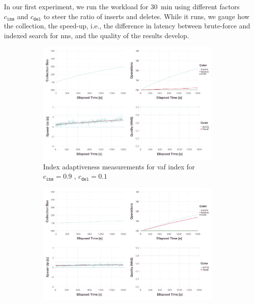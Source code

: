 In our first experiment, we run the workload for \SI{30}{\minute} using different factors $c_{\texttt{ins}}$ and $c_{\texttt{del}}$ to steer the ratio of inserts and deletes. While it runs, we gauge how the collection, the speed-up, i.e., the difference in latency between brute-force and indexed search for \acrshort{nns}, and the quality of the results develop.

\begin{figure}[p]
    \centering
    \begin{subfigure}[b]{\textwidth}
        \centering
        \includegraphics[width=\textwidth]{figures/index/index-vaf-adaptiveness-90-10-no-rebuild}
        \caption{Index adaptiveness measurements for \acrshort{vaf} index for $c_{\texttt{ins}} = 0.9$ , $c_{\texttt{del}} = 0.1$ }
        \label{figure:index_adaptiveness_vaf_90_10}
    \end{subfigure}
    \hfill
    \centering
    \begin{subfigure}[b]{\textwidth}
        \centering
        \includegraphics[width=\textwidth]{figures/index/index-vaf-adaptiveness-50-50-no-rebuild}

\end{subfigure}
\end{figure}
